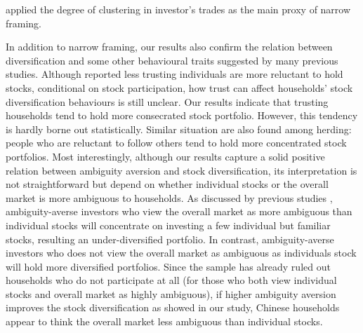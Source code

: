 \documentclass[ukenglish,nottitlepage,thmsb,11pt,letterpaper]{article}
\begin{document}
applied the degree of clustering in investor’s trades as the main proxy of narrow framing.   

In addition to narrow framing, our results also confirm the relation between diversification and some other behavioural traits suggested by many previous studies. Although \citet{Guiso2008} reported less trusting individuals are more reluctant to hold stocks, conditional on stock participation, how trust can affect households' stock diversification behaviours is still unclear. Our results indicate that trusting households tend to hold more consecrated stock portfolio. However, this tendency is hardly borne out statistically. Similar situation are also found among herding: people who are reluctant to follow others tend to hold more concentrated stock portfolios.  Most interestingly, although our results capture a solid positive relation between ambiguity aversion and stock diversification, its interpretation is not straightforward but depend on whether individual stocks or the overall market is more ambiguous to households. As discussed by previous studies \citep[e.g., ][]{Boyle2012,Dimmock2016},  ambiguity-averse investors who view the overall market as more ambiguous than individual stocks will concentrate on investing a few individual but familiar stocks, resulting an under-diversified portfolio. In contrast,  ambiguity-averse investors who does not view the overall market as ambiguous as individuals stock will hold more diversified portfolios. Since the sample has already ruled out households who do not participate at all (for those who both view individual stocks and overall market as highly ambiguous), if higher ambiguity aversion improves the stock diversification as showed in our study, Chinese households appear to think the overall market less ambiguous than individual stocks. 
\end{document}
